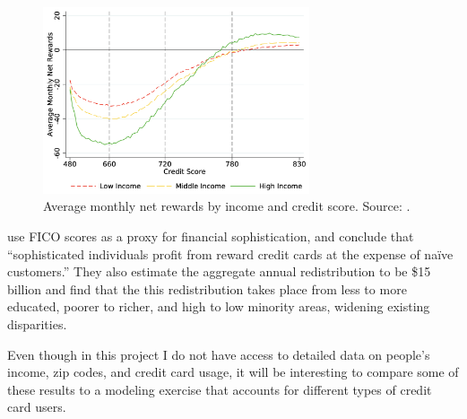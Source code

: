 \begin{figure}[t!h]
    \begin{center}
    \includegraphics[width=0.7\textwidth]{../Misc/Agarwal_NetRewardsByIncome.png}
    \caption{Average monthly net rewards by income and credit score. Source: \citet{agaretal:2023}.}
    \label{fig:AgarwalRewards}
    \end{center}
\end{figure}

\citet*{agaretal:2023} use FICO scores as a proxy for financial sophistication, and conclude that ``sophisticated individuals profit from reward credit cards at the expense of na\"{i}ve customers.''
They also estimate the aggregate annual redistribution to be \$15 billion and find that the this redistribution takes place from less to more educated, poorer to richer, and high to low minority areas, widening existing disparities.

Even though in this project I do not have access to detailed data on people's income, zip codes, and credit card usage, it will be interesting to compare some of these results to a modeling exercise that accounts for different types of credit card users. 

